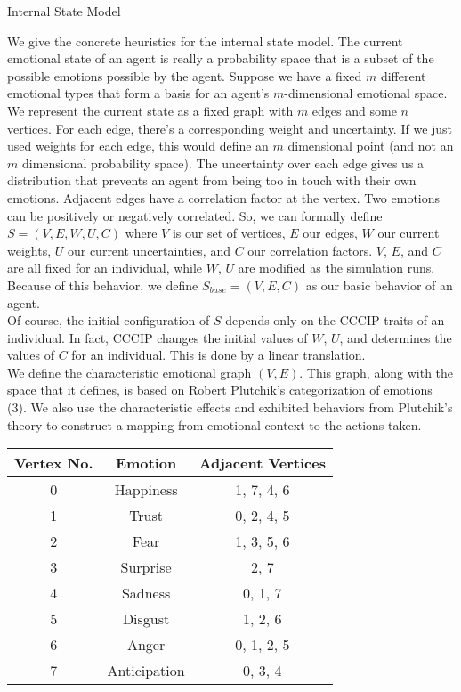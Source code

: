 \documentclass[11pt]{article}
\begin{document}
\begin{section}{Internal State Model}

We give the concrete heuristics for the internal state model. The current emotional state of an agent is really a probability space that is a subset of the possible emotions possible by the agent. Suppose we have a fixed $m$ different emotional types that form a basis for an agent's $m$-dimensional emotional space. We represent the current state as a fixed graph with $m$ edges and some $n$ vertices. For each edge, there's a corresponding weight and uncertainty. If we just used weights for each edge, this would define an $m$ dimensional point (and not an $m$ dimensional probability space). The uncertainty over each edge gives us a distribution that prevents an agent from being too in touch with their own emotions. Adjacent edges have a correlation factor at the vertex. Two emotions can be positively or negatively correlated. So, we can formally define $S = (V, E, W, U, C)$ where $V$ is our set of vertices, $E$ our edges, $W$ our current weights, $U$ our current uncertainties, and $C$ our correlation factors. $V$, $E$, and $C$ are all fixed for an individual, while $W$, $U$ are modified as the simulation runs. Because of this behavior, we define $S_{base} = (V, E, C)$ as our basic behavior of an agent.\\

Of course, the initial configuration of $S$ depends only on the CCCIP traits of an individual. In fact, CCCIP changes the initial values of $W$, $U$, and determines the values of $C$ for an individual. This is done by a linear translation. \\

We define the characteristic emotional graph $(V, E)$. This graph, along with the space that it defines, is based on Robert Plutchik's categorization of emotions (3). We also use the characteristic effects and exhibited behaviors from Plutchik's theory to construct a mapping from emotional context to the actions taken. \\

\begin{center}
\begin{tabular}{|c|c|c|}
\hline 
Vertex No. & Emotion & Adjacent Vertices \\ 
\hline
0 & Happiness & 1, 7, 4, 6\\ 
\hline
1 & Trust & 0, 2, 4, 5\\
\hline
2 & Fear & 1, 3, 5, 6\\ 
\hline
3 & Surprise & 2, 7\\
\hline
4 & Sadness & 0, 1, 7\\ 
\hline
5 & Disgust & 1, 2, 6\\ 
\hline
6 & Anger & 0, 1, 2, 5\\
\hline
7 & Anticipation & 0, 3, 4\\ 
\hline
\end{tabular}
\end{center}


\end{section}
\end{document}

